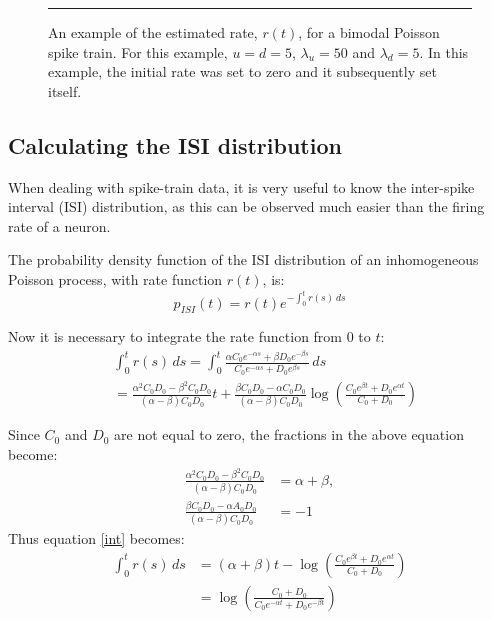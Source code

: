 \begin{figure}

\bigskip
\rule{35em}{0.5pt}
\caption{An example of the estimated rate, $r(t)$, for a bimodal Poisson spike train.  For this example, $u=d=5$, $\lambda_u=50$ and $\lambda_d=5$.  In this example, the initial rate was set to zero and it subsequently set itself.}
\end{figure}

\subsection{Calculating the ISI distribution}

When dealing with spike-train data, it is very useful to know the inter-spike interval (ISI) distribution, as this can be observed much easier than the firing rate of a neuron.

The probability density function of the ISI distribution of an inhomogeneous Poisson process, with rate function $r(t)$, is:
\begin{equation}
p_{ISI}(t) = r(t) e^{-\int_0^t r(s)\,ds}
\end{equation}

Now it is necessary to integrate the rate function from $0$ to $t$:
\begin{equation}
\begin{split}
\label{int}
&\int_0^t r(s)\,ds = \int_0^t  \frac{\alpha C_0e^{-\alpha s}+\beta D_0e^{-\beta s}}{C_0e^{-\alpha s} + D_0e^{\beta s}}\,ds\\ 
&= \frac{\alpha^2 C_0D_0 - \beta^2 C_0D_0}{(\alpha - \beta)C_0D_0}t + \frac{\beta C_0D_0-\alpha C_0D_0}{(\alpha - \beta)C_0D_0} \log\left({\frac{C_0e^{\beta t} + D_0e^{\alpha t}}{C_0 + D_0} }\right)
\end{split}
\end{equation}

Since $C_0$ and $D_0$ are not equal to zero, the fractions in the above equation become:
\begin{equation}
\begin{split}
\frac{\alpha^2 C_0D_0 - \beta^2 C_0D_0}{(\alpha - \beta)C_0D_0} & = \alpha+\beta,\\
 \frac{ \beta C_0D_0-\alpha A_0D_0}{(\alpha - \beta)C_0D_0} &= -1
\end{split}
\end{equation}
Thus equation \ref{int} becomes:
\begin{equation}
\begin{split}
\int_0^t r(s)\,ds &= (\alpha+\beta)t - \log\left( {\frac{C_0e^{\beta t} + D_0e^{\alpha t}}{C_0 + D_0} }\right) \\
&= \log \left( \frac{C_0+D_0}{C_0e^{-\alpha t}+D_0e^{-\beta t}}\right)
\end{split}
\end{equation}

